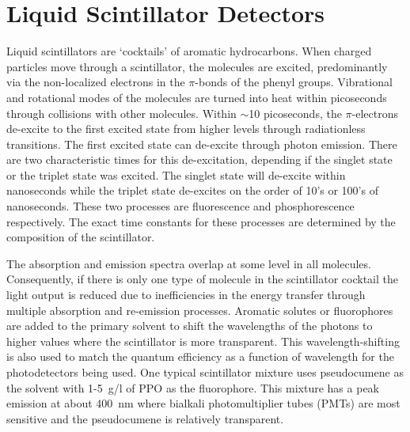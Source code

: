 \documentclass[aps,prc,twocolumn,groupedaddress,showpacs,amsmath,amssymb,floatfix,superscriptaddress]{revtex4}
\begin{document}
\section{Liquid Scintillator Detectors}
Liquid scintillators are `cocktails' of aromatic hydrocarbons. When
charged particles move through a scintillator, the molecules are
excited, predominantly via the non-localized electrons in the
$\pi$-bonds of the phenyl groups\cite{birks_book}. Vibrational
and rotational modes of the molecules are turned into heat within
picoseconds through collisions with other molecules.  Within $\sim$10
picoseconds, the $\pi$-electrons de-excite to the first excited state
from higher levels through radiationless transitions. The first
excited state can de-excite through photon emission. There are two
characteristic times for this de-excitation, depending if the singlet
state or the triplet state was excited.  The singlet state will
de-excite within nanoseconds while the triplet state de-excites on the
order of 10's or 100's of nanoseconds. These two processes are
fluorescence and phosphorescence respectively. The exact time
constants for these processes are determined by the composition of the
scintillator.

The absorption and emission spectra overlap at some level
in all molecules. Consequently, if there is only one type of molecule in
the scintillator cocktail the light output is reduced due to
inefficiencies in the energy transfer through multiple absorption and
re-emission processes. Aromatic solutes or fluorophores are added to the
primary solvent to shift the wavelengths of the photons to higher values 
where the scintillator is more transparent. This
wavelength-shifting is also used to match the quantum efficiency as a
function of wavelength for the photodetectors being used. One typical
scintillator mixture uses pseudocumene as the solvent with 1-5~g/l of
PPO as the fluorophore. This mixture has a peak emission at about 400~nm
where bialkali photomultiplier tubes (PMTs) are most sensitive and the
pseudocumene is relatively transparent.
\end{document}
